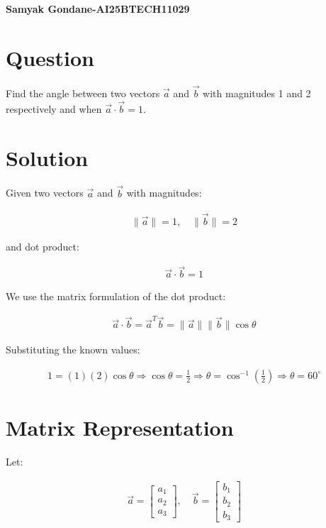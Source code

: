 \documentclass{article}
\begin{document}
\begin{center}
\large
    \textbf{Samyak Gondane-AI25BTECH11029}
\end{center}
\date{}

\section*{Question}
Find the angle between two vectors $\vec{a}$ and $\vec{b}$ with magnitudes 1 and 2 respectively and when $\vec{a}\cdot\vec{b} = 1$.

\section*{Solution}
Given two vectors $\vec{a}$ and $\vec{b}$ with magnitudes:


\begin{align}
\|\vec{a}\| = 1, \quad \|\vec{b}\| = 2
\end{align}


and dot product:


\begin{align}
\vec{a} \cdot \vec{b} = 1
\end{align}



We use the matrix formulation of the dot product:


\begin{align}
\vec{a} \cdot \vec{b} = \vec{a}^T \vec{b} = \|\vec{a}\| \|\vec{b}\| \cos\theta
\end{align}



Substituting the known values:


\begin{align}
1 = (1)(2)\cos\theta \Rightarrow \cos\theta = \frac{1}{2}
\Rightarrow \theta = \cos^{-1}\left(\frac{1}{2}\right)
\Rightarrow \theta = 60^\circ
\end{align}



\section*{Matrix Representation}

Let:


\begin{align}
\vec{a} = \begin{bmatrix} a_1 \\ a_2 \\ a_3 \end{bmatrix}, \quad
\vec{b} = \begin{bmatrix} b_1 \\ b_2 \\ b_3 \end{bmatrix}
\end{align}
\end{document}
